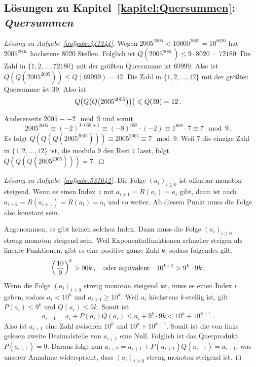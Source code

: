 \subsection*{Lösungen zu Kapitel~\ref{kapitel:Quersummen}: \emph{Quersummen}}

\begin{proof}[Lösung zu Aufgabe~\ref{aufgabe:441244}]
	Wegen $2005^{2005}<10000^{2005}=10^{8020}$ hat $2005^{2005}$ höchstens $8020$ Stellen. Folglich ist $Q(2005^{2005})\leqslant 9\cdot 8020=72180$. Die Zahl in $\{1,2,\dotsc,72180\}$ mit der größten Quersumme ist $69999$. Also ist $Q(Q(2005^{2005}))\leqslant Q(69999)=42$. Die Zahl in $\{1,2,\dotsc,42\}$ mit der größten Quersumme ist $39$. Also ist
	\begin{equation*}
		Q\parens*{Q\parens*{Q\parens*{2005^{2005}}}}\leqslant Q(39)=12\,.
	\end{equation*}
	
	Andererseits $2005\equiv -2\mod 9$ und somit
	\begin{equation*}
		2005^{2005}\equiv (-2)^{3\cdot 668+1}\equiv (-8)^{668}\cdot (-2)\equiv 1^{668}\cdot 7\equiv 7\mod 9\,.
	\end{equation*}
	Es folgt $Q(Q(Q(2005^{2005})))\equiv 2005^{2005}\equiv 7\mod 9$. Weil $7$ die einzige Zahl in $\{1,2,\dotsc,12\}$ ist, die modulo $9$ den Rest $7$ lässt, folgt $Q(Q(Q(2005^{2005})))=7$.
\end{proof}
\begin{proof}[Lösung zu Aufgabe~\ref{aufgabe:531042}]
	Die Folge $(a_i)_{i\geqslant 0}$ ist offenbar monoton steigend. Wenn es einen Index~$i$ mit $a_{i+1}=R(a_i)=a_i$ gibt, dann ist auch $a_{i+2}=R(a_{i+1})=R(a_i)=a_i$ und so weiter. Ab diesem Punkt muss die Folge also konstant sein.
	
	Angenommen, es gibt keinen solchen Index. Dann muss die Folge $(a_i)_{i\geqslant 0}$ streng monoton steigend sein. Weil Exponentialfunktionen schneller steigen als lineare Funktionen, gibt es eine positive ganze Zahl $k$, sodass folgendes gilt:
	\begin{equation*}
		\parens*{\frac{10}{9}}^k>90k\,,\quad \text{oder äquivalent}\quad 10^{k-1}>9^k\cdot 9k\,.
	\end{equation*}
	Wenn die Folge $(a_i)_{i\geqslant 0}$ streng monoton steigend ist, muss es einen Index $i$ geben, sodass $a_i<10^k$ und $a_{i+1}\geqslant 10^k$. Weil $a_i$ höchstens $k$-stellig ist, gilt $P(a_i)\leqslant 9^k$ und $Q(a_i)\leqslant 9k$. Somit ist
	\begin{equation*}
		a_{i+1}=a_i+P(a_i)Q(a_i)\leqslant a_i+9^k\cdot 9k<10^{k}+10^{k-1}\,.
	\end{equation*}
	Also ist $a_{i+1}$ eine Zahl zwischen $10^k$ und $10^k+10^{k-1}$. Somit ist die von links gelesen zweite Dezimalstelle von $a_{i+1}$ eine Null. Folglich ist das Querprodukt $P(a_{i+1})=0$. Daraus folgt nun $a_{i+2}=a_{i+1}+P(a_{i+1})Q(a_{i+1})=a_{i+1}$, was unserer Annahme widerspricht, dass $(a_i)_{i\geqslant 0}$ streng monoton steigend ist.
\end{proof}